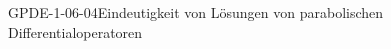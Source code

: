 
\begin{KORO}{GPDE-1-06-04}{Eindeutigkeit von Lösungen von parabolischen Differentialoperatoren}
\end{KORO}
